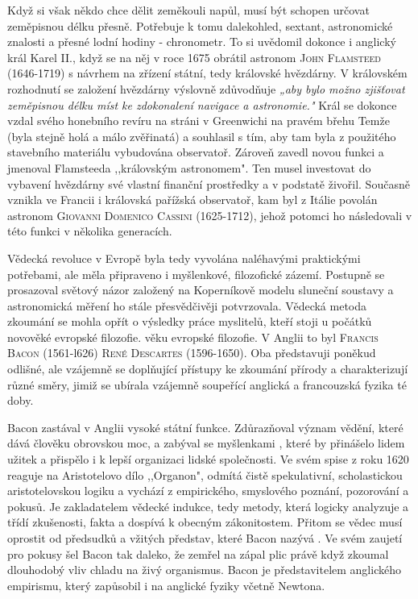     Když si však někdo chce dělit zeměkouli napůl, musí být schopen určovat zeměpisnou délku přesně.
    Potřebuje k tomu dalekohled, sextant, astronomické znalosti a přesné lodní hodiny - chronometr.
    To si uvědomil dokonce i anglický král Karel II., když se na něj v roce 1675 obrátil astronom
    \textsc{John Flamsteed} (1646-1719) s návrhem na zřízení státní, tedy královské hvězdárny. V
    královském rozhodnutí se založení hvězdárny výslovně zdůvodňuje \emph{„aby bylo možno zjišťovat
    zeměpisnou délku míst ke zdokonalení navigace a astronomie."} Král se dokonce vzdal svého
    honebního revíru na stráni v Greenwichi na pravém břehu Temže (byla stejně holá a málo
    zvěřinatá) a souhlasil s tím, aby tam byla z použitého stavebního materiálu vybudována
    observatoř. Zároveň zavedl novou funkci a jmenoval Flamsteeda ,,královským astronomem". Ten
    musel investovat do vybavení hvězdárny své vlastní finanční prostředky a v podstatě živořil.
    Současně vznikla ve Francii i královská pařížská observatoř, kam byl z Itálie povolán astronom
    \textsc{Giovanni Domenico Cassini} (1625-1712), jehož potomci ho následovali v této funkci v
    několika generacích.

    Vědecká revoluce v Evropě byla tedy vyvolána naléhavými praktickými potřebami, ale měla
    připraveno i myšlenkové, filozofické zázemí. Postupně se prosazoval světový názor založený na
    Koperníkově modelu sluneční soustavy a astronomická měření ho stále přesvědčivěji potvrzovala.
    Vědecká metoda zkoumání se mohla opřít o výsledky práce myslitelů, kteří stoji u počátků
    novověké evropské filozofie. věku evropské filozofie. V Anglii to byl \textsc{Francis Bacon}
    (1561-l626) \textsc{René Descartes} (1596-1650). Oba představuji poněkud odlišné, ale vzájemně
    se doplňující přístupy ke zkoumání přírody a charakterizují různé směry, jimiž se ubírala
    vzájemně soupeřící anglická a francouzská fyzika té doby. 
    
    Bacon zastával v Anglii vysoké státní funkce. Zdůrazňoval význam vědění, které dává člověku
    obrovskou moc, a zabýval se myšlenkami , které by přinášelo lidem
    užitek a přispělo i k lepší organizaci lidské společnosti. Ve svém spise  z
    roku 1620 reaguje na Aristotelovo dílo ,,Organon", odmítá čistě spekulativní, scholastickou
    aristotelovskou logiku a vychází z empirického, smyslového poznání, pozorování a pokusů. Je
    zakladatelem vědecké indukce, tedy metody, která logicky analyzuje a třídí zkušenosti, fakta a
    dospívá k obecným zákonitostem. Přitom se vědec musí oprostit od předsudků a vžitých představ,
    které Bacon nazývá  . Ve svém zaujetí pro pokusy šel Bacon tak daleko, že zemřel na
    zápal plic právě když zkoumal dlouhodobý vliv chladu na živý organismus. Bacon je představitelem
    anglického empirismu, který zapůsobil i na anglické fyziky včetně Newtona.  
    
